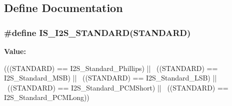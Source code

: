 \subsection{Define Documentation}
\hypertarget{group__I2S__Standard_ga826b9ddb34520b8fa64c2b65c9bfd528}{
\subsubsection[{IS\_\-I2S\_\-STANDARD}]{\setlength{\rightskip}{0pt plus 5cm}\#define IS\_\-I2S\_\-STANDARD(STANDARD)}}
\label{group__I2S__Standard_ga826b9ddb34520b8fa64c2b65c9bfd528}
{\bfseries Value:}
\begin{DoxyCode}
(((STANDARD) == I2S_Standard_Phillips) || \
                                   ((STANDARD) == I2S_Standard_MSB) || \
                                   ((STANDARD) == I2S_Standard_LSB) || \
                                   ((STANDARD) == I2S_Standard_PCMShort) || \
                                   ((STANDARD) == I2S_Standard_PCMLong))
\end{DoxyCode}
